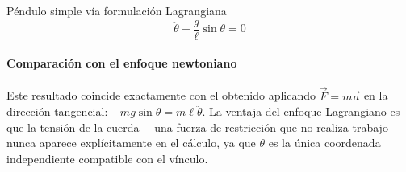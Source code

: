 \begin{solucion}{Péndulo simple vía formulación Lagrangiana}
$$\boxed{\ddot\theta + \frac{g}{\ell}\sin\theta = 0}$$

\paragraph{Comparación con el enfoque newtoniano} Este resultado coincide exactamente con el obtenido aplicando $\vec{F}=m\vec{a}$ en la dirección tangencial: $-mg\sin\theta = m\ell\ddot\theta$. La ventaja del enfoque Lagrangiano es que la tensión de la cuerda —una fuerza de restricción que no realiza trabajo— nunca aparece explícitamente en el cálculo, ya que $\theta$ es la única coordenada independiente compatible con el vínculo.
\end{solucion}
